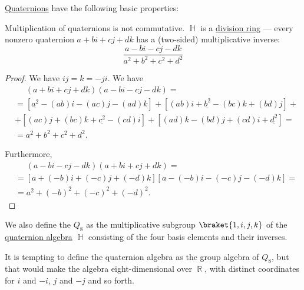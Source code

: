 \begin{proposition}\label{thm:def:quaternion_algebra}
  \hyperref[def:quaternion_algebra]{Quaternions} have the following basic properties:
  \begin{thmenum}
     Multiplication of quaternions is not commutative.
     \( \BbbH \) is a \hyperref[def:division_ring]{division ring} --- every nonzero quaternion \( a + bi + cj + dk \) has a (two-sided) multiplicative inverse:
    \begin{equation}\label{eq:thm:def:quaternion_algebra/inverse}
      \frac {a - bi - cj - dk} {a^2 + b^2 + c^2 + d^2}
    \end{equation}
  \end{thmenum}
\end{proposition}
\begin{proof}
   We have \( ij = k = -ji \).
   We have
  \begin{align*}
    &\phantom{{}={}}
    (a + bi + cj + dk) (a - bi - cj - dk)
    = \\ &=
    [\underline{a^2} - (ab)i - (ac)j - (ad)k]
    +
    [(ab)i + \underline{b^2} - (bc)k + (bd)j]
    + \\ &+
    [(ac)j + (bc)k + \underline{c^2} - (cd)i]
    +
    [(ad)k - (bd)j + (cd)i + \underline{d^2}]
    = \\ &=
    a^2 + b^2 + c^2 + d^2.
  \end{align*}

  Furthermore,
  \begin{align*}
    &\phantom{{}={}}
    (a - bi - cj - dk) (a + bi + cj + dk)
    = \\ &=
    [a + (-b) i + (-c) j + (-d) k] [a - (-b) i - (-c) j - (-d) k]
    = \\ &=
    a^2 + (-b)^2 + (-c)^2 + (-d)^2.
  \end{align*}
\end{proof}

\begin{definition}\label{def:quaternionic_group}
  We also define the  \( Q_8 \) as the multiplicative subgroup \( \braket{ 1, i, j, k } \) of the \hyperref[def:quaternion_algebra]{quaternion algebra} \( \BbbH \) consisting of the four basis elements and their inverses.
\end{definition}
\begin{comments}
  \item It is tempting to define the quaternion algebra as the group algebra of \( Q_8 \), but that would make the algebra eight-dimensional over \( \BbbR \), with distinct coordinates for \( i \) and \( -i \), \( j \) and \( -j \) and so forth.
\end{comments}

